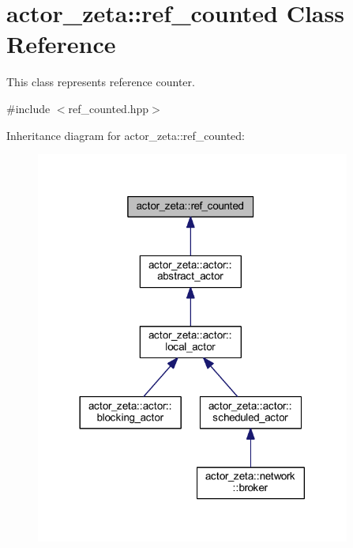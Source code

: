 \hypertarget{classactor__zeta_1_1ref__counted}{}\section{actor\+\_\+zeta\+:\+:ref\+\_\+counted Class Reference}
\label{classactor__zeta_1_1ref__counted}


This class represents reference counter.  




{\ttfamily \#include $<$ref\+\_\+counted.\+hpp$>$}



Inheritance diagram for actor\+\_\+zeta\+:\+:ref\+\_\+counted\+:\nopagebreak
\begin{figure}[H]
\begin{center}
\leavevmode
\includegraphics[width=293pt]{classactor__zeta_1_1ref__counted__inherit__graph}
\end{center}
\end{figure}
